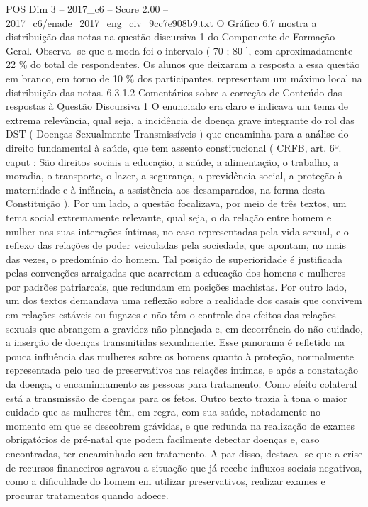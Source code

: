 \begin{textsample}{POS Dim 3 – 2017\_c6 – Score 2.00 – 2017\_c6/enade\_2017\_eng\_civ\_9cc7e908b9.txt}
O Gráfico 6.7 mostra a distribuição das notas na questão discursiva 1 do Componente de Formação Geral.
Observa -se que a moda foi o intervalo ( 70 ; 80 ], com aproximadamente 22 \% do total de respondentes.
Os alunos que deixaram a resposta a essa questão em branco, em torno de 10 \% dos participantes, representam um máximo local na distribuição das notas. 6.3.1.2 Comentários sobre a correção de Conteúdo das respostas à Questão Discursiva 1 O enunciado era claro e indicava um tema de extrema relevância, qual seja, a incidência de doença grave integrante do rol das DST ( Doenças Sexualmente Transmissíveis ) que encaminha para a análise do direito fundamental à saúde, que tem assento constitucional ( CRFB, art. 6º. caput : São direitos sociais a educação, a saúde, a alimentação, o trabalho, a moradia, o transporte, o lazer, a segurança, a previdência social, a proteção à maternidade e à infância, a assistência aos desamparados, na forma desta Constituição ).
Por um lado, a questão focalizava, por meio de três textos, um tema social extremamente relevante, qual seja, o da relação entre homem e mulher nas suas interações íntimas, no caso representadas pela vida sexual, e o reflexo das relações de poder veiculadas pela sociedade, que apontam, no mais das vezes, o predomínio do homem.
Tal posição de superioridade é justificada pelas convenções arraigadas que acarretam a educação dos homens e mulheres por padrões patriarcais, que redundam em posições machistas.
Por outro lado, um dos textos demandava uma reflexão sobre a realidade dos casais que convivem em relações estáveis ou fugazes e não têm o controle dos efeitos das relações sexuais que abrangem a gravidez não planejada e, em decorrência do não cuidado, a inserção de doenças transmitidas sexualmente.
Esse panorama é refletido na pouca influência das mulheres sobre os homens quanto à proteção, normalmente representada pelo uso de preservativos nas relações intimas, e após a constatação da doença, o encaminhamento as pessoas para tratamento.
Como efeito colateral está a transmissão de doenças para os fetos.
Outro texto trazia à tona o maior cuidado que as mulheres têm, em regra, com sua saúde, notadamente no momento em que se descobrem grávidas, e que redunda na realização de exames obrigatórios de pré-natal que podem facilmente detectar doenças e, caso encontradas, ter encaminhado seu tratamento.
A par disso, destaca -se que a crise de recursos financeiros agravou a situação que já recebe influxos sociais negativos, como a dificuldade do homem em utilizar preservativos, realizar exames e procurar tratamentos quando adoece.

\end{textsample}
